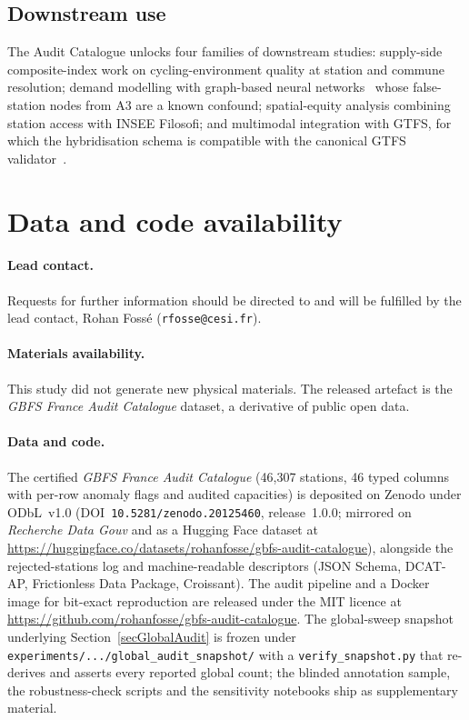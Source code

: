 \documentclass[11pt,a4paper]{article}
\newif\ifanonymous
\newcommand{\zdoi}{\ifanonymous\texttt{[deposited on Zenodo; DOI withheld for review]}\else\texttt{10.5281/zenodo.20125460}\fi}
\newcommand{\codeurl}{\ifanonymous\texttt{[anonymised repository; link provided on acceptance]}\else\url{https://github.com/rohanfosse/gbfs-audit-catalogue}\fi}
\newcommand{\hfurl}{\ifanonymous\texttt{[anonymised dataset mirror]}\else\url{https://huggingface.co/datasets/rohanfosse/gbfs-audit-catalogue}\fi}
\begin{document}

\subsection{Downstream use}
The Audit Catalogue unlocks four families of downstream studies:
supply-side composite-index work on cycling-environment quality at
station and commune resolution; demand modelling with graph-based
neural networks~\cite{Lin2018BSSGraph} whose false-station nodes
from A3 are a known confound; spatial-equity analysis combining
station access with INSEE Filosofi; and multimodal integration with
GTFS, for which the hybridisation schema is compatible with the
canonical GTFS validator~\cite{MobilityData2024Validator}.


\section*{Data and code availability}

\paragraph{Lead contact.} \ifanonymous Author contact details are
withheld for double-blind review.\else Requests for further information
should be directed to and will be fulfilled by the lead contact, Rohan
Foss\'e (\texttt{rfosse@cesi.fr}).\fi

\paragraph{Materials availability.} This study did not generate new
physical materials. The released artefact is the
\emph{GBFS France Audit Catalogue} dataset, a derivative of public open
data.

\paragraph{Data and code.}
The certified \emph{GBFS France Audit Catalogue} (46{,}307 stations,
46 typed columns with per-row anomaly flags and audited capacities) is
deposited on Zenodo under ODbL~v1.0
(DOI~\zdoi, release~1.0.0; mirrored on
\emph{Recherche Data Gouv} and as a Hugging Face dataset at
\hfurl),
alongside the rejected-stations log and machine-readable descriptors
(JSON Schema, DCAT-AP, Frictionless Data Package, Croissant). The audit
pipeline and a Docker image for bit-exact reproduction are released under
the MIT licence at \codeurl. The global-sweep
snapshot underlying Section~\ref{secGlobalAudit} is frozen under
\texttt{experiments/.../global\_audit\_snapshot/} with a
\texttt{verify\_snapshot.py} that re-derives and asserts every reported
global count; the blinded annotation sample, the robustness-check scripts
and the sensitivity notebooks ship as supplementary material.
\end{document}
